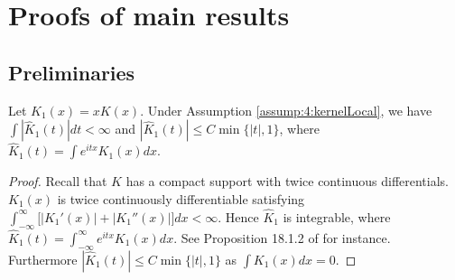 \section{Proofs of main results} 

\subsection{Preliminaries}
\begin{lem}  Let $K_1(x)=xK(x)$. Under Assumption \ref{assump:4:kernelLocal}, we have
$\int|\hat K_1(t)|dt<\infty$ and $|\hat K_1(t)|\le C\min\{|t|,1\}$, where $\hat K_1(t)=\int e^{itx}K_1(x)dx$.
\end{lem}

\begin{proof} Recall that $K$ has a compact
support with twice continuous differentials.
 $K_1(x)$ is twice continuously differentiable satisfying $\int_{-\infty}^{\infty}
\big[|K_1'(x)|+|K_1''(x)|\big]dx<\infty$.
Hence $\widehat K_1$ is integrable, where
 $\widehat K_1(t)=\int_{-\infty}^{\infty}e^{itx}K_1(x)dx$.
See Proposition 18.1.2 of \cite{gasquetwitomski1999} for instance.
Furthermore $|\widehat K_1(t)|\le C\min\{|t|, 1\}$ as $\int K_1(x)dx=0$.
\end{proof}

